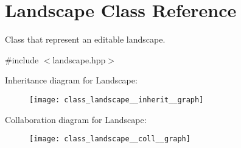 \hypertarget{class_landscape}{}\section{Landscape Class Reference}
\label{class_landscape}


Class that represent an editable landscape.  




{\ttfamily \#include $<$landscape.\+hpp$>$}



Inheritance diagram for Landscape\+:\nopagebreak
\begin{figure}[H]
\begin{center}
\leavevmode
\texttt{[image: class\_landscape\_\_inherit\_\_graph]}
\end{center}
\end{figure}


Collaboration diagram for Landscape\+:\nopagebreak
\begin{figure}[H]
\begin{center}
\leavevmode
\texttt{[image: class\_landscape\_\_coll\_\_graph]}
\end{center}
\end{figure}

